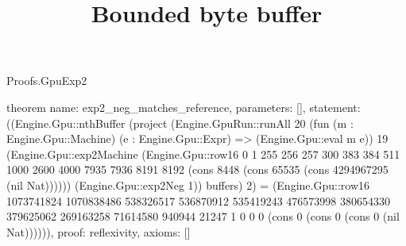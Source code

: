 \begin{lexlean}{Proofs.GpuExp2}
\title{Bounded byte buffer}
\begin{semanticmodule}
theorem{
  name: exp2_neg_matches_reference,
  parameters: [],
  statement: ((Engine.Gpu::nthBuffer (project (Engine.GpuRun::runAll 20 (fun (m : Engine.Gpu::Machine) (e : Engine.Gpu::Expr) => (Engine.Gpu::eval m e)) 19 (Engine.Gpu::exp2Machine (Engine.Gpu::row16 0 1 255 256 257 300 383 384 511 1000 2600 4000 7935 7936 8191 8192 (cons 8448 (cons 65535 (cons 4294967295 (nil Nat)))))) (Engine.Gpu::exp2Neg 1)) buffers) 2) = (Engine.Gpu::row16 1073741824 1070838486 538326517 536870912 535419243 476573998 380654330 379625062 269163258 71614580 940944 21247 1 0 0 0 (cons 0 (cons 0 (cons 0 (nil Nat)))))),
  proof: reflexivity{},
  axioms: []
}
\end{semanticmodule}
\end{lexlean}
